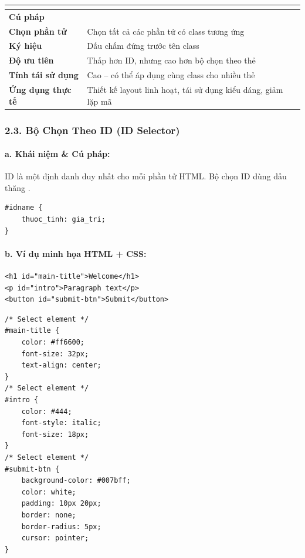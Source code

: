 \begin{prettyTableBox}
\sffamily\small
\begin{tabularx}{\linewidth}{|>{\bfseries\color{primaryBlue}}K{3.5cm}|Z|}
\hline
{}  &  \\
\hline
Cú pháp &  \\
\hline
Chọn phần tử & Chọn tất cả các phần tử có class tương ứng \\
\hline
Ký hiệu & Dấu chấm  đứng trước tên class \\
\hline
Độ ưu tiên & Thấp hơn ID, nhưng cao hơn bộ chọn theo thẻ \\
\hline
Tính tái sử dụng & Cao -- có thể áp dụng cùng class cho nhiều thẻ \\
\hline
Ứng dụng thực tế & Thiết kế layout linh hoạt, tái sử dụng kiểu dáng, giảm lặp mã \\
\hline
\end{tabularx}
\end{prettyTableBox}

\subsubsection{2.3. Bộ Chọn Theo ID (ID Selector)}

\paragraph{a. Khái niệm \& Cú pháp:}
ID là một định danh duy nhất cho mỗi phần tử HTML. Bộ chọn ID dùng dấu thăng \codeinline{\#}.
\begin{codeWindow}
\begin{lstlisting}[language=CSS3]
#idname {
    thuoc_tinh: gia_tri;
}
\end{lstlisting}
\end{codeWindow}

\paragraph{b. Ví dụ minh họa HTML + CSS:}
\begin{codeWindow}
\begin{lstlisting}[language=HTML5]
<h1 id="main-title">Welcome</h1>
<p id="intro">Paragraph text</p>
<button id="submit-btn">Submit</button>
\end{lstlisting}

\begin{lstlisting}[language=CSS3]
/* Select element */
#main-title {
    color: #ff6600;
    font-size: 32px;
    text-align: center;
}
/* Select element */
#intro {
    color: #444;
    font-style: italic;
    font-size: 18px;
}
/* Select element */
#submit-btn {
    background-color: #007bff;
    color: white;
    padding: 10px 20px;
    border: none;
    border-radius: 5px;
    cursor: pointer;
}
\end{lstlisting}
\end{codeWindow}

